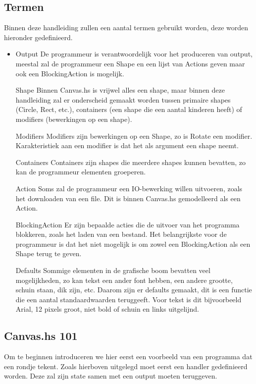 \subsection{Termen}
Binnen deze handleiding zullen een aantal termen gebruikt worden, deze worden hieronder gedefinieerd.
\begin{itemize}
	\item Output
De programmeur is verantwoordelijk voor het produceren van output, meestal zal de programmeur een Shape en een lijst van Actions geven maar ook een BlockingAction is mogelijk.
	\item[Shape]
Binnen Canvas.hs is vrijwel alles een shape, maar binnen deze handleiding zal er onderscheid gemaakt worden tussen primaire shapes (Circle, Rect, etc.), containers (een shape die een aantal kinderen heeft) of modifiers (bewerkingen op een shape).
	\item[Modifiers]
Modifiers zijn bewerkingen op een Shape, zo is Rotate een modifier. Karakteristiek aan een modifier is dat het als argument een shape neemt.
	\item[Containers]
Containers zijn shapes die meerdere shapes kunnen bevatten, zo kan de programmeur elementen groeperen.
	\item[Action]
Soms zal de programmeur een IO-bewerking willen uitvoeren, zoals het downloaden van een file. Dit is binnen Canvas.hs gemodelleerd als een Action.
	\item[BlockingAction]
Er zijn bepaalde acties die de uitvoer van het programma blokkeren, zoals het laden van een bestand. Het belangrijkste voor de programmeur is dat het niet mogelijk is om zowel een BlockingAction als een Shape terug te geven. 
    \item[Defaults]
Sommige elementen in de grafische boom bevatten veel mogelijkheden, zo kan tekst een ander font hebben, een andere grootte, schuin staan, dik zijn, etc. Daarom zijn er defaults gemaakt, dit is een functie die een aantal standaardwaarden teruggeeft. Voor tekst is dit bijvoorbeeld Arial, 12 pixels groot, niet bold of schuin en links uitgelijnd.
\end{itemize}

\subsection{Canvas.hs 101}
Om te beginnen introduceren we hier eerst een voorbeeld van een programma dat een rondje tekent. Zoals hierboven uitgelegd moet eerst een handler gedefinieerd worden. Deze zal zijn state samen met een output moeten teruggeven.

